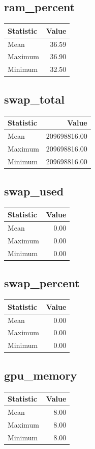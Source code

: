 \documentclass[11pt]{article}
\begin{document}
\subsection{ram_percent}
\begin{tabular}{lr}
\toprule
Statistic & Value \\
\midrule
Mean & 36.59 \\
Maximum & 36.90 \\
Minimum & 32.50 \\
\bottomrule
\end{tabular}


\subsection{swap_total}
\begin{tabular}{lr}
\toprule
Statistic & Value \\
\midrule
Mean & 209698816.00 \\
Maximum & 209698816.00 \\
Minimum & 209698816.00 \\
\bottomrule
\end{tabular}


\subsection{swap_used}
\begin{tabular}{lr}
\toprule
Statistic & Value \\
\midrule
Mean & 0.00 \\
Maximum & 0.00 \\
Minimum & 0.00 \\
\bottomrule
\end{tabular}


\subsection{swap_percent}
\begin{tabular}{lr}
\toprule
Statistic & Value \\
\midrule
Mean & 0.00 \\
Maximum & 0.00 \\
Minimum & 0.00 \\
\bottomrule
\end{tabular}


\subsection{gpu_memory}
\begin{tabular}{lr}
\toprule
Statistic & Value \\
\midrule
Mean & 8.00 \\
Maximum & 8.00 \\
Minimum & 8.00 \\
\bottomrule
\end{tabular}
\end{document}
